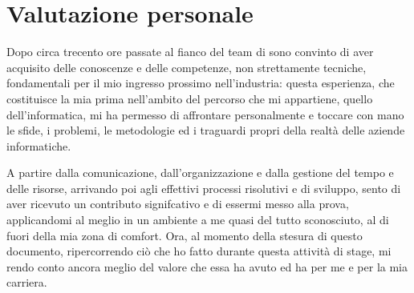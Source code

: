 \section{Valutazione personale}

Dopo circa trecento ore passate al fianco del team di \myAzienda  sono convinto di aver acquisito delle conoscenze e delle competenze, non strettamente tecniche, fondamentali per il mio ingresso prossimo nell'industria: questa esperienza, che costituisce la mia prima nell'ambito del percorso che mi appartiene, quello dell'informatica, mi ha permesso di affrontare personalmente e toccare con mano le sfide, i problemi, le metodologie ed i traguardi propri della realtà delle aziende informatiche.

A partire dalla comunicazione, dall'organizzazione e dalla gestione del tempo e delle risorse, arrivando poi agli effettivi processi risolutivi e di sviluppo, sento di aver ricevuto un contributo signifcativo e di essermi messo alla prova, applicandomi al meglio in un ambiente a me quasi del tutto sconosciuto, al di fuori della mia zona di comfort.
Ora, al momento della stesura di questo documento, ripercorrendo ciò che ho fatto durante questa attività di stage, mi rendo conto ancora meglio del valore che essa ha avuto ed ha per me e per la mia carriera.
